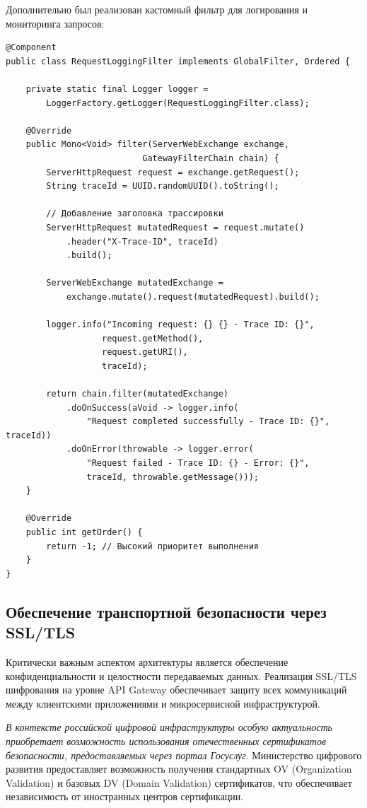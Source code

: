 Дополнительно был реализован кастомный фильтр для логирования и мониторинга запросов:

\begin{verbatim}
@Component
public class RequestLoggingFilter implements GlobalFilter, Ordered {

    private static final Logger logger =
        LoggerFactory.getLogger(RequestLoggingFilter.class);

    @Override
    public Mono<Void> filter(ServerWebExchange exchange,
                           GatewayFilterChain chain) {
        ServerHttpRequest request = exchange.getRequest();
        String traceId = UUID.randomUUID().toString();

        // Добавление заголовка трассировки
        ServerHttpRequest mutatedRequest = request.mutate()
            .header("X-Trace-ID", traceId)
            .build();

        ServerWebExchange mutatedExchange =
            exchange.mutate().request(mutatedRequest).build();

        logger.info("Incoming request: {} {} - Trace ID: {}",
                   request.getMethod(),
                   request.getURI(),
                   traceId);

        return chain.filter(mutatedExchange)
            .doOnSuccess(aVoid -> logger.info(
                "Request completed successfully - Trace ID: {}", traceId))
            .doOnError(throwable -> logger.error(
                "Request failed - Trace ID: {} - Error: {}",
                traceId, throwable.getMessage()));
    }

    @Override
    public int getOrder() {
        return -1; // Высокий приоритет выполнения
    }
}
\end{verbatim}
\subsection{Обеспечение транспортной безопасности через SSL/TLS}

Критически важным аспектом архитектуры является обеспечение конфиденциальности и целостности передаваемых данных. Реализация SSL/TLS шифрования на уровне API Gateway обеспечивает защиту всех коммуникаций между клиентскими приложениями и микросервисной инфраструктурой.

\textit{В контексте российской цифровой инфраструктуры особую актуальность приобретает возможность использования отечественных сертификатов безопасности, предоставляемых через портал Госуслуг}. Министерство цифрового развития предоставляет возможность получения стандартных OV (Organization Validation) и базовых DV (Domain Validation) сертификатов, что обеспечивает независимость от иностранных центров сертификации.

